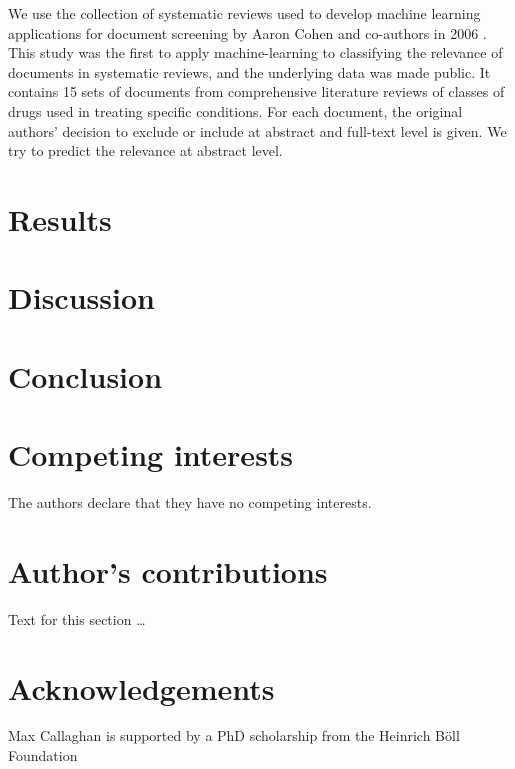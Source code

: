 \documentclass{bmcart}
\begin{document}
	
	
	
	We use the collection of systematic reviews used to develop machine learning applications for document screening by Aaron Cohen and co-authors in 2006 \cite{Cohen2006}. This study was the first to apply machine-learning to classifying the relevance of documents in systematic reviews, and the underlying data was made public. It contains 15 sets of documents from comprehensive literature reviews of classes of drugs used in treating specific conditions. For each document, the original authors' decision to exclude or include at abstract and full-text level is given. We try to predict the relevance at abstract level.
	
	\section*{Results}
	
	\section*{Discussion}
	
	\section*{Conclusion}
	
\begin{backmatter}
	
	\section*{Competing interests}
	The authors declare that they have no competing interests.
	
	\section*{Author's contributions}
	Text for this section \ldots
	
	\section*{Acknowledgements}
	Max Callaghan is supported by a PhD scholarship from the Heinrich Böll Foundation
		
	
	
	
\end{backmatter}
\end{document}
